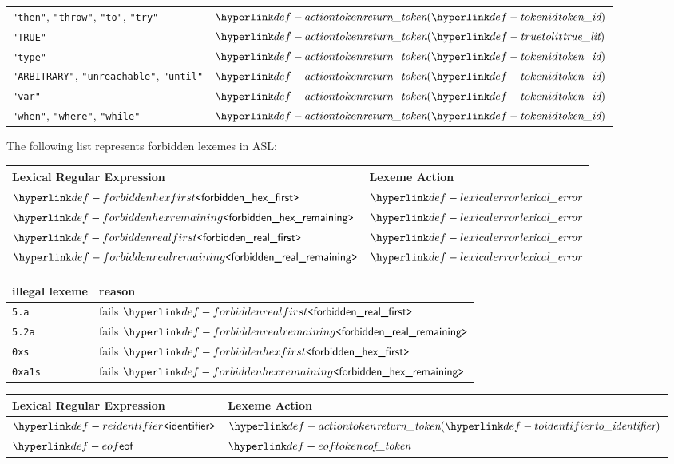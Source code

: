 \begin{center}
\begin{tabular}{ll}
\texttt{"then"},    \texttt{"throw"},   \texttt{"to"}, \texttt{"try"}         & $\actiontoken(\tokenid)$ \\
\texttt{"TRUE"}          & $\actiontoken(\truetolit)$ \\
\texttt{"type"}          & $\actiontoken(\tokenid)$ \\
\texttt{"ARBITRARY"}, \texttt{"unreachable"}, \texttt{"until"}         & $\actiontoken(\tokenid)$ \\
\texttt{"var"}           & $\actiontoken(\tokenid)$ \\
\texttt{"when"}, \texttt{"where"}, \texttt{"while"}          & $\actiontoken(\tokenid)$ \\
\end{tabular}
\end{center}

The following list represents forbidden lexemes in ASL:
\begin{center}
  \begin{tabular}{ll}
    \textbf{Lexical Regular Expression} & \textbf{Lexeme Action}\\
    \hline
    $\REforbiddenhexfirst$ & $\lexicalerror$ \\
    $\REforbiddenhexremaining$ & $\lexicalerror$ \\
    $\REforbiddenrealfirst$ & $\lexicalerror$ \\
    $\REforbiddenrealremaining$ & $\lexicalerror$ \\
  \end{tabular}
\end{center}

\begin{center}
\begin{tabular}{ll}
\textbf{illegal lexeme} & \textbf{reason}\\
\hline
\verb|5.a| & fails $\REforbiddenrealfirst$\\
\verb|5.2a| & fails $\REforbiddenrealremaining$\\
\verb|0xs| & fails $\REforbiddenhexfirst$\\
\verb|0xa1s| & fails $\REforbiddenhexremaining$\\
\end{tabular}
\end{center}
\begin{center}
\begin{tabular}{ll}

\textbf{Lexical Regular Expression} & \textbf{Lexeme Action}\\
\hline
$\REidentifier$   & $\actiontoken(\toidentifier)$ \\
$\eof$            & $\eoftoken$ \\
\end{tabular}
\end{center}

